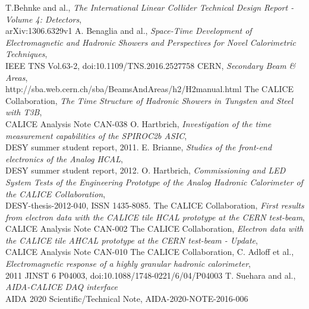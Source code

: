 \documentclass[twoside,a4paper,11pt]{article}
\begin{document}
\clearpage

\begin{thebibliography}{10}
T.Behnke and al., \textit{The International Linear Collider Technical Design Report - Volume 4: Detectors}, \\
arXiv:1306.6329v1
	A. Benaglia and al., \textit{Space-Time Development of Electromagnetic and Hadronic Showers and Perspectives for Novel Calorimetric Techniques}, \\
	IEEE TNS Vol.63-2, doi:10.1109/TNS.2016.2527758
	CERN, \textit{Secondary Beam \& Areas}, \\
	http://sba.web.cern.ch/sba/BeamsAndAreas/h2/H2manual.html
	The CALICE Collaboration, \textit{The Time Structure of Hadronic Showers in Tungsten and Steel with T3B}, \\
	CALICE Analysis Note CAN-038
	 O. Hartbrich, \textit{Investigation of the time measurement capabilities of the SPIROC2b ASIC}, \\
	 DESY summer student report, 2011.
	 E. Brianne, \textit{Studies of the front-end electronics of the Analog HCAL}, \\
	 DESY summer student report, 2012.
	 O. Hartbrich, \textit{Commissioning and LED System Tests of the Engineering Prototype of the Analog Hadronic Calorimeter of the CALICE Collaboration}, \\
	 DESY-thesis-2012-040, ISSN 1435-8085.
	 The CALICE Collaboration, \textit{First results from electron data with the CALICE tile HCAL prototype at the CERN test-beam}, \\
	 CALICE Analysis Note CAN-002
	 The CALICE Collaboration, \textit{Electron data with the CALICE tile AHCAL prototype at the CERN test-beam - Update}, \\
	 CALICE Analysis Note CAN-010
	 The CALICE Collaboration, C. Adloff et al., \textit{Electromagnetic response of a highly granular hadronic calorimeter}, \\
	 2011 JINST 6 P04003, doi:10.1088/1748-0221/6/04/P04003
	 T. Suehara and al., \textit{AIDA-CALICE DAQ interface} \\
	 AIDA 2020 Scientific/Technical Note, AIDA-2020-NOTE-2016-006
\end{thebibliography}
\end{document}
